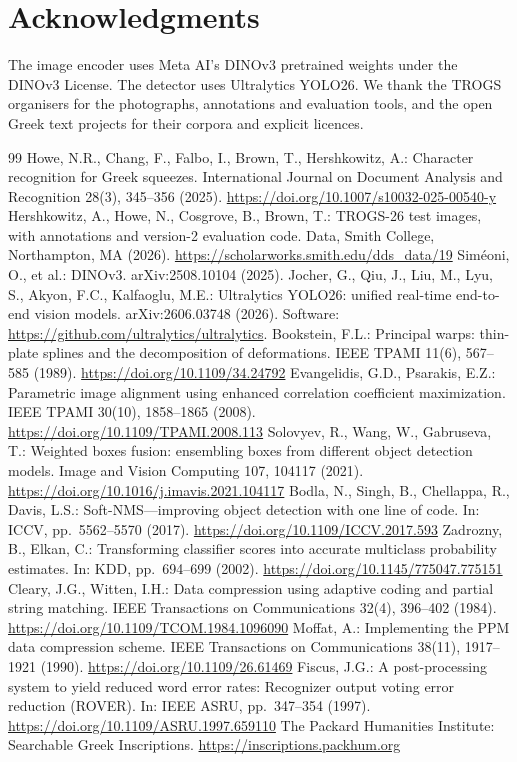 \documentclass[11pt]{article}
\begin{document}
\section*{Acknowledgments}
The image encoder uses Meta AI's DINOv3 pretrained weights under the DINOv3 License. The detector uses
Ultralytics YOLO26. We thank the TROGS organisers for the photographs, annotations and evaluation tools,
and the open Greek text projects for their corpora and explicit licences.

\begin{thebibliography}{99}\footnotesize\setlength{\itemsep}{0pt}
 Howe, N.R., Chang, F., Falbo, I., Brown, T., Hershkowitz, A.: Character recognition for Greek
squeezes. International Journal on Document Analysis and Recognition 28(3), 345--356 (2025).
\url{https://doi.org/10.1007/s10032-025-00540-y}
 Hershkowitz, A., Howe, N., Cosgrove, B., Brown, T.: TROGS-26 test images, with
annotations and version-2 evaluation code. Data, Smith College, Northampton, MA (2026).
\url{https://scholarworks.smith.edu/dds_data/19}
 Sim\'eoni, O., et al.: DINOv3. arXiv:2508.10104 (2025).
 Jocher, G., Qiu, J., Liu, M., Lyu, S., Akyon, F.C., Kalfaoglu, M.E.: Ultralytics YOLO26:
unified real-time end-to-end vision models. arXiv:2606.03748 (2026). Software:
\url{https://github.com/ultralytics/ultralytics}.
 Bookstein, F.L.: Principal warps: thin-plate splines and the decomposition of deformations.
IEEE TPAMI 11(6), 567--585 (1989). \url{https://doi.org/10.1109/34.24792}
 Evangelidis, G.D., Psarakis, E.Z.: Parametric image alignment using enhanced correlation
coefficient maximization. IEEE TPAMI 30(10), 1858--1865 (2008). \url{https://doi.org/10.1109/TPAMI.2008.113}
 Solovyev, R., Wang, W., Gabruseva, T.: Weighted boxes fusion: ensembling boxes from different
object detection models. Image and Vision Computing 107, 104117 (2021).
\url{https://doi.org/10.1016/j.imavis.2021.104117}
 Bodla, N., Singh, B., Chellappa, R., Davis, L.S.: Soft-NMS---improving object detection with
one line of code. In: ICCV, pp.~5562--5570 (2017). \url{https://doi.org/10.1109/ICCV.2017.593}
 Zadrozny, B., Elkan, C.: Transforming classifier scores into accurate multiclass probability
estimates. In: KDD, pp.~694--699 (2002). \url{https://doi.org/10.1145/775047.775151}
 Cleary, J.G., Witten, I.H.: Data compression using adaptive coding and partial string matching.
IEEE Transactions on Communications 32(4), 396--402 (1984). \url{https://doi.org/10.1109/TCOM.1984.1096090}
 Moffat, A.: Implementing the PPM data compression scheme. IEEE Transactions on Communications
38(11), 1917--1921 (1990). \url{https://doi.org/10.1109/26.61469}
 Fiscus, J.G.: A post-processing system to yield reduced word error rates: Recognizer output
voting error reduction (ROVER). In: IEEE ASRU, pp.~347--354 (1997). \url{https://doi.org/10.1109/ASRU.1997.659110}
 The Packard Humanities Institute: Searchable Greek Inscriptions.
\url{https://inscriptions.packhum.org}
\end{thebibliography}
\end{document}
